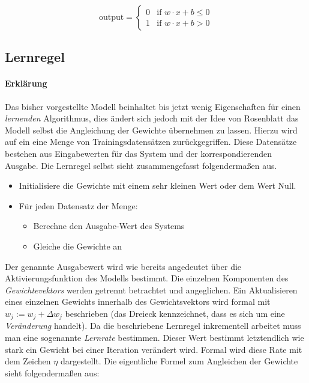 \begin{equation} \label{eq:aktFkt3}
\mbox{output} =\begin{cases}
	0 & \mbox{if } w\cdot x + b \leq 0 \\
    1 & \mbox{if } w\cdot x + b > 0
  \end{cases}
\end{equation}



\subsection{Lernregel} \label{ss:lernregel}

\paragraph{Erklärung}

Das bisher vorgestellte Modell beinhaltet bis jetzt wenig Eigenschaften für einen \emph{lernenden} Algorithmus, dies ändert sich jedoch mit der Idee von Rosenblatt das Modell selbst die Angleichung der Gewichte übernehmen zu lassen. Hierzu wird auf ein eine Menge von Trainingsdatensätzen zurückgegriffen. 
Diese Datensätze bestehen aus Eingabewerten für das System und der korrespondierenden Ausgabe. Die Lernregel selbst sieht zusammengefasst folgendermaßen aus. 

\begin{minipage}{\textwidth}
\begin{itemize}
\item Initialisiere die Gewichte mit einem sehr kleinen Wert oder dem Wert Null. 
\item Für jeden Datensatz der Menge: 
\begin{itemize}
	\item Berechne den Ausgabe-Wert des Systems 
	\item Gleiche die Gewichte an 
\end{itemize}
\end{itemize}
\end{minipage}

\vspace{5 mm}

Der genannte Ausgabewert wird wie bereits angedeutet über die Aktivierungsfunktion des Modells bestimmt. Die einzelnen Komponenten des \emph{Gewichtevektors} werden getrennt betrachtet und angeglichen. Ein Aktualisieren eines einzelnen Gewichts innerhalb des Gewichtsvektors wird formal mit $w_j := w_j + \Delta w_j$ beschrieben (das Dreieck kennzeichnet, dass es sich um eine \emph{Veränderung} handelt). Da die beschriebene Lernregel inkrementell arbeitet muss man eine sogenannte \emph{Lernrate} bestimmen. Dieser Wert bestimmt letztendlich wie stark ein Gewicht bei einer Iteration verändert wird. Formal wird diese Rate mit dem Zeichen $\eta$ dargestellt. Die eigentliche Formel zum Angleichen der Gewichte sieht folgendermaßen aus: 

